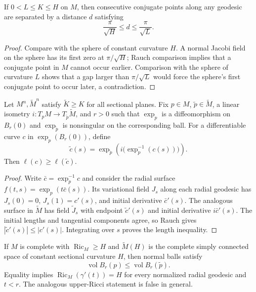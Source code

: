 \begin{proposition}
  \label{prop:dc-ch10-2-4}
  If $0<L\leq K\leq H$ on $M$, then consecutive conjugate points along any geodesic
  are separated by a distance $d$ satisfying
  \[
  \frac{\pi}{\sqrt H}\leq d\leq\frac{\pi}{\sqrt L}.
  \]
\end{proposition}
\begin{proof}
  \sketch
  Compare with the sphere of constant curvature $H$. A normal Jacobi field on the
  sphere has its first zero at $\pi/\sqrt H$; Rauch comparison implies that a
  conjugate point in $M$ cannot occur earlier. Comparison with the sphere of
  curvature $L$ shows that a gap larger than $\pi/\sqrt L$ would force the sphere's
  first conjugate point to occur later, a contradiction.
\end{proof}

\begin{proposition}
  \label{prop:dc-ch10-2-5}
  Let $M^n,\widetilde M^n$ satisfy $\widetilde K\geq K$ for all sectional planes.
  Fix $p\in M$, $\tilde p\in\widetilde M$, a linear isometry
  $i:T_pM\to T_{\tilde p}\widetilde M$, and $r>0$ such that $\exp_p$ is a
  diffeomorphism on $B_r(0)$ and $\exp_{\tilde p}$ is nonsingular on the corresponding
  ball. For a differentiable curve $c$ in $\exp_p(B_r(0))$, define
  \[
  \tilde c(s)=\exp_{\tilde p}\!\left(i\bigl(\exp_p^{-1}(c(s))\bigr)\right).
  \]
  Then $\ell(c)\geq\ell(\tilde c)$.
\end{proposition}
\begin{proof}
  \sketch
  Write $\bar c=\exp_p^{-1}c$ and consider the radial surface
  $f(t,s)=\exp_p(t\bar c(s))$. Its variational field $J_s$ along each radial geodesic
  has $J_s(0)=0$, $J_s(1)=c'(s)$, and initial derivative $\bar c'(s)$. The analogous
  surface in $\widetilde M$ has field $\tilde J_s$ with endpoint $\tilde c'(s)$ and
  initial derivative $i\bar c'(s)$. The initial lengths and tangential components
  agree, so Rauch gives $|\tilde c'(s)|\leq|c'(s)|$. Integrating over $s$ proves the
  length inequality.
\end{proof}

\begin{remark}
  \label{rem:dc-ch10-2-6}
  If $M$ is complete with $\operatorname{Ric}_M\geq H$ and
  $\widetilde M(H)$ is the complete simply connected space of constant sectional
  curvature $H$, then normal balls satisfy
  \[
  \operatorname{vol} B_r(p)\leq \operatorname{vol}B_r(\tilde p).
  \]
  Equality implies $\operatorname{Ric}_M(\gamma'(t))=H$ for every normalized radial
  geodesic and $t<r$. The analogous upper-Ricci statement is false in general.
\end{remark}

